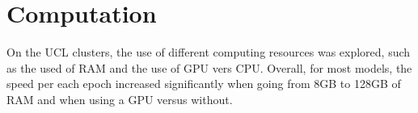 \section{ Computation}
On the UCL clusters, the use of different computing resources was explored, such as the used of RAM and the use of GPU vers CPU. Overall, for most models, the speed per each epoch increased significantly when going from 8GB to 128GB of RAM and when using a GPU versus without. 
 